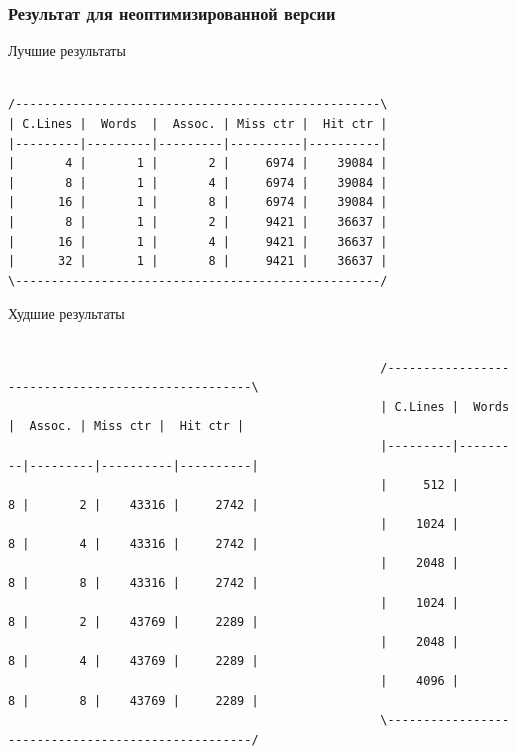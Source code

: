 \documentclass{beamer}
\begin{document}

\begin{frame}[fragile] %
\frametitle{Результат для неоптимизированной версии}

\begin{block}{Лучшие результаты}
\begin{verbatim}

/---------------------------------------------------\
| C.Lines |  Words  |  Assoc. | Miss ctr |  Hit ctr |
|---------|---------|---------|----------|----------|
|       4 |       1 |       2 |     6974 |    39084 |
|       8 |       1 |       4 |     6974 |    39084 |
|      16 |       1 |       8 |     6974 |    39084 |
|       8 |       1 |       2 |     9421 |    36637 |
|      16 |       1 |       4 |     9421 |    36637 |
|      32 |       1 |       8 |     9421 |    36637 |
\---------------------------------------------------/

\end{verbatim}
\end{block}

\begin{block}{Худшие результаты}
\begin{verbatim}

                                                    /---------------------------------------------------\
                                                    | C.Lines |  Words  |  Assoc. | Miss ctr |  Hit ctr |
                                                    |---------|---------|---------|----------|----------|
                                                    |     512 |       8 |       2 |    43316 |     2742 |
                                                    |    1024 |       8 |       4 |    43316 |     2742 |
                                                    |    2048 |       8 |       8 |    43316 |     2742 |
                                                    |    1024 |       8 |       2 |    43769 |     2289 |
                                                    |    2048 |       8 |       4 |    43769 |     2289 |
                                                    |    4096 |       8 |       8 |    43769 |     2289 |
                                                    \---------------------------------------------------/

\end{verbatim}
\end{block}

\end{frame}
\end{document}
